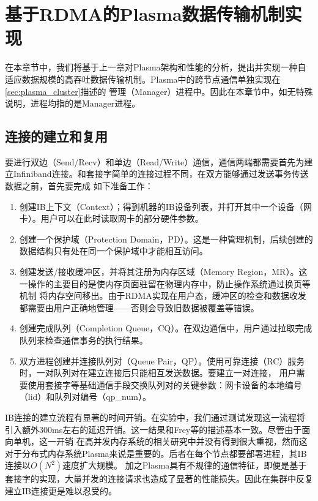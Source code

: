 \chapter{基于RDMA的Plasma数据传输机制实现}
\label{cha:implementation}

在本章节中，我们将基于上一章对Plasma架构和性能的分析，提出并实现一种自适应数据规模的高吞吐数据传输机制。Plasma中的跨节点通信单独实现在\autoref{sec:plasma_cluster}描述的
管理（Manager）进程中。因此在本章节中，如无特殊说明，进程均指的是Manager进程。

\section{连接的建立和复用}
\label{sec:ib_con}

要进行双边（Send/Recv）和单边（Read/Write）通信，通信两端都需要首先为建立Infiniband连接。和套接字简单的连接过程不同，在双方能够通过发送事务传送数据之前，首先要完成
如下准备工作：

\begin{enumerate}
	\item 创建IB上下文（Context）；得到机器的IB设备列表，并打开其中一个设备（网卡）。用户可以在此时读取网卡的部分硬件参数。
	\item 创建一个保护域（Protection Domain，PD）。这是一种管理机制，后续创建的数据结构只有处在同一个保护域中才能相互访问。
	\item 创建发送/接收缓冲区，并将其注册为内存区域（Memory Region，MR）。这一操作的主要目的是使内存页面驻留在物理内存中，防止操作系统通过换页等机制
	将内存空间移出。由于RDMA实现在用户态，缓冲区的检查和数据收发都需要由用户正确地管理——否则会导致旧数据被覆盖等错误。
	\item 创建完成队列（Completion Queue，CQ）。在双边通信中，用户通过拉取完成队列来检查通信事务的执行结果。
	\item 双方进程创建并连接队列对（Queue Pair，QP）。使用可靠连接（RC）服务时，一对队列对在建立连接后只能相互发送数据。要建立一对连接，
	用户需要使用套接字等基础通信手段交换队列对的关键参数：网卡设备的本地编号（lid）和队列对编号（qp\_num）。
\end{enumerate}

IB连接的建立流程有显著的时间开销。在实验中，我们通过测试发现这一流程将引入额外300ms左右的延迟开销。这一结果和Frey等\cite{frey2009minimizing}的描述基本一致。尽管由于面向单机，这一开销
在高并发内存系统的相关研究中并没有得到很大重视，然而这对于分布式内存系统Plasma来说是重要的。后者在每个节点都要部署进程，其IB连接以$O(N^2)$速度扩大规模。
加之Plasma具有不规律的通信特征，即便是基于套接字的实现，大量并发的连接请求也造成了显著的性能损失。因此在集群中反复建立IB连接更是难以忍受的。

